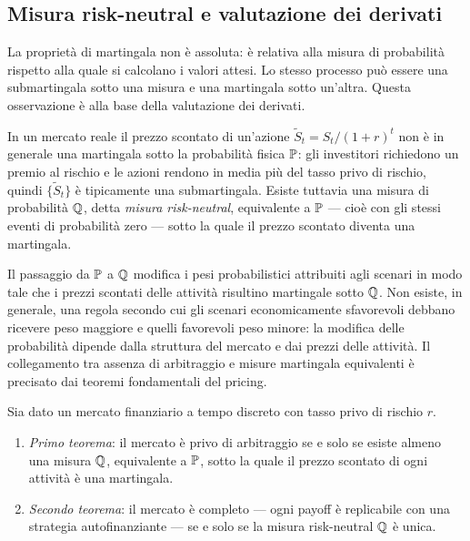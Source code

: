 \subsection{Misura risk-neutral e valutazione dei derivati}

La propriet\`{a} di martingala non \`{e} assoluta: \`{e}
relativa alla misura di probabilit\`{a} rispetto alla quale
si calcolano i valori attesi. Lo stesso processo pu\`{o} essere
una submartingala sotto una misura e una martingala sotto
un'altra. Questa osservazione \`{e} alla base della valutazione
dei derivati.

In un mercato reale il prezzo scontato di un'azione
$\tilde{S}_t=S_t/(1+r)^t$ non \`{e} in generale una
martingala sotto la probabilit\`{a} fisica $\mathbb{P}$: gli
investitori richiedono un premio al rischio e le azioni
rendono in media pi\`{u} del tasso privo di rischio, quindi
$\{\tilde{S}_t\}$ \`{e} tipicamente una submartingala. Esiste
tuttavia una misura di probabilit\`{a} $\mathbb{Q}$, detta
\emph{misura risk-neutral}, equivalente a $\mathbb{P}$ ---
cio\`{e} con gli stessi eventi di probabilit\`{a} zero ---
sotto la quale il prezzo scontato diventa una martingala.

Il passaggio da $\mathbb{P}$ a $\mathbb{Q}$ modifica i pesi probabilistici
attribuiti agli scenari in modo tale che i prezzi scontati delle
attivit\`{a} risultino martingale sotto $\mathbb{Q}$. Non esiste, in
generale, una regola secondo cui gli scenari economicamente
sfavorevoli debbano ricevere peso maggiore e quelli favorevoli
peso minore: la modifica delle probabilit\`{a} dipende dalla
struttura del mercato e dai prezzi delle attivit\`{a}. Il
collegamento tra assenza di arbitraggio e misure martingala
equivalenti \`{e} precisato dai teoremi fondamentali del pricing.

\begin{theorem}
\label{thm:ftap}
Sia dato un mercato finanziario a tempo discreto con tasso
privo di rischio $r$.
\begin{enumerate}
\item \emph{Primo teorema}: il mercato \`{e} privo di
arbitraggio se e solo se esiste almeno una misura $\mathbb{Q}$,
equivalente a $\mathbb{P}$, sotto la quale il prezzo scontato di
ogni attivit\`{a} \`{e} una martingala.
\item \emph{Secondo teorema}: il mercato \`{e} completo ---
ogni payoff \`{e} replicabile con una strategia autofinanziante
--- se e solo se la misura risk-neutral $\mathbb{Q}$ \`{e} unica.
\end{enumerate}
\end{theorem}

